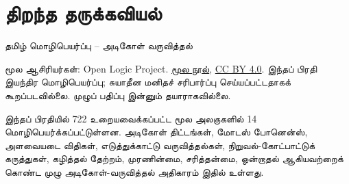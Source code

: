 \documentclass[11pt,a4paper,openany]{memoir}
\begin{document}
\raggedright
\pagestyle{plain}
\chapter*{திறந்த தருக்கவியல்}
\noindent தமிழ் மொழிபெயர்ப்பு -- அடிகோள் வருவித்தல்

\noindent மூல ஆசிரியர்கள்: Open Logic Project.
\href{https://github.com/OpenLogicProject/OpenLogic}{மூல நூல்},
\href{https://creativecommons.org/licenses/by/4.0/}{CC BY 4.0}.
இந்தப் பிரதி இயந்திர மொழிபெயர்ப்பு; சுயாதீன மனிதச் சரிபார்ப்பு செய்யப்பட்டதாகக்
கூறப்படவில்லை. முழுப் பதிப்பு இன்னும் தயாராகவில்லை.

\noindent இந்தப் பிரதியில் 722 உறையவைக்கப்பட்ட மூல அலகுகளில் 14
மொழிபெயர்க்கப்பட்டுள்ளன. அடிகோள் திட்டங்கள், மோடஸ் போனென்ஸ், அளவையடை விதிகள்,
எடுத்துக்காட்டு வருவித்தல்கள், நிறுவல்-கோட்பாட்டுக் கருத்துகள், கழித்தல் தேற்றம்,
முரணின்மை, சரித்தன்மை, ஒன்றாதல் ஆகியவற்றைக் கொண்ட முழு அடிகோள்-வருவித்தல்
அதிகாரம் இதில் உள்ளது.

\clearpage
\tableofcontents*

\end{document}
